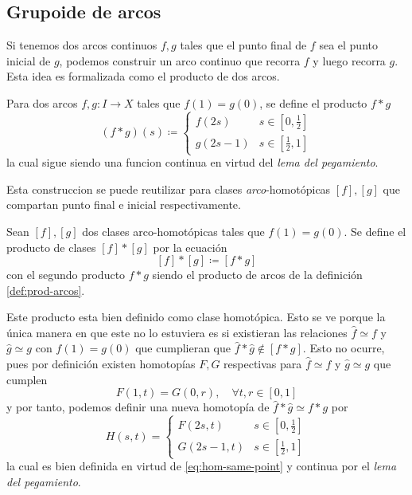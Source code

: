 \subsection{Grupoide de arcos}
Si tenemos dos arcos continuos \(f,g\) tales que el punto final de \(f\)
sea el punto inicial de \(g\), podemos construir un arco continuo que
recorra \(f\) y luego recorra \(g\). Esta idea es formalizada como
el producto de dos arcos.

\begin{definicion} \label{def:prod-arcos}
Para dos arcos \(f,g : I \to X\) tales que
\(f(1) = g(0)\), se define el producto \(f * g \)
\[ (f*g) (s) \coloneqq \begin{cases}
    f(2s) & s \in [0,\frac{1}{2}] \\
    g(2s - 1) & s \in [\frac{1}{2} , 1]
  \end{cases}
\]
la cual sigue siendo una funcion continua en virtud del \emph{lema del
pegamiento}.
\end{definicion}

Esta construccion se puede reutilizar para clases
\emph{arco}-homotópicas \([f],[g]\) que compartan punto final e inicial
respectivamente.
\begin{definicion}
  Sean \([f],[g]\) dos clases arco-homotópicas tales que \( f(1) =
  g(0)\). Se define el producto de clases \([f] * [g]\) por la ecuación
  \[ [f] * [g] \coloneqq [f * g] \]
  con el segundo producto \(f * g\) siendo el producto de arcos de la
  definición \ref{def:prod-arcos}.
\end{definicion}
\begin{acotacion}
  Este producto esta bien definido como clase homotópica. Esto se ve
  porque la única manera en que este no lo estuviera es si existieran las
  relaciones \(\hat f \simeq f\) y \(\hat g \simeq g\) con \(f(1) = g(0)\)
  que cumplieran que \(\hat f * \hat g \not \in [f * g]\). Esto no ocurre,
  pues por definición existen homotopías \(F,G\) respectivas para \(\hat f
  \simeq f\) y \(\hat g \simeq g\) que cumplen
  \begin{equation}
  F(1,t) = G(0,r) , \quad \forall t,r \in [0,1] \label{eq:hom-same-point}
  \end{equation}
  y por tanto, podemos definir una nueva homotopía de \(\hat f * \hat
  g \simeq f * g\) por
  \[
    H(s,t) = \begin{cases}
      F(2s,t) & s \in [0, \frac{1}{2}] \\
      G(2s - 1, t) & s \in [\frac{1}{2} , 1]
    \end{cases}
  \]
  la cual es bien definida en virtud de \eqref{eq:hom-same-point} y
  continua por el \emph{lema del pegamiento}.
\end{acotacion}

